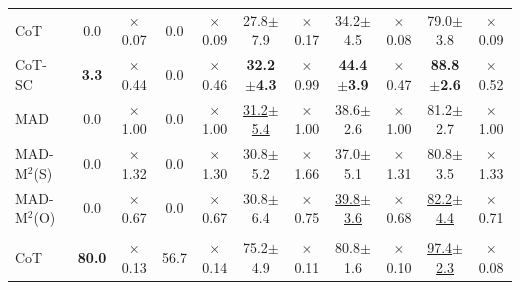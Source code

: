 \documentclass{article} %
\newcommand{\methodname}{MAD-M$^2$}
\theoremstyle{plain}
\begin{document}
\begin{table}[t]
\begin{center}
\begin{small}
\begin{threeparttable}
\begin{tabular}{lcccccccccc}
                    \midrule
                    \rowcolor{Gray}
                    \multicolumn{11}{c}{\texttt{DeepSeek-Math-7B-Instruct}} \\
                    \midrule
                    CoT & 0.0 & $\times$0.07 & 0.0 & $\times$0.09 & 27.8$\pm$7.9 & $\times$0.17 & 34.2$\pm$4.5 & $\times$0.08 & 79.0$\pm$3.8 & $\times$0.09\\
                    CoT-SC & \textbf{3.3} & $\times$0.44 & 0.0 & $\times$0.46 & \textbf{32.2$\pm$4.3} & $\times$0.99 & \textbf{44.4$\pm$3.9} & $\times$0.47 & \textbf{88.8$\pm$2.6} & $\times$0.52\\
                    MAD & 0.0  &$\times$1.00 & 0.0 &$\times$1.00 & \uline{31.2$\pm$5.4} &$\times$1.00 & 38.6$\pm$2.6 & $\times$1.00 & 81.2$\pm$2.7 & $\times$1.00\\
                    \rowcolor{gray!15}\methodname (S) & 0.0  &$\times$1.32 & 0.0 &$\times$1.30 & 30.8$\pm$5.2 &$\times$1.66 & 37.0$\pm$5.1 &$\times$1.31 & 80.8$\pm$3.5 & $\times$1.33\\
                    \rowcolor{gray!15}\methodname (O) & 0.0  & $\times$0.67 & 0.0 &$\times$0.67 & 30.8$\pm$6.4 &$\times$0.75 & \uline{39.8$\pm$3.6} &$\times$0.68 & \uline{82.2$\pm$4.4} & $\times$0.71\\
                    \midrule
                    \rowcolor{Gray}
                    \multicolumn{11}{c}{\texttt{QwQ-32B}} \\
                    \midrule
                    CoT & \textbf{80.0} & $\times$0.13 & 56.7 & $\times$0.14 & 75.2$\pm$4.9 & $\times$0.11 & 80.8$\pm$1.6 & $\times$0.10 & \uline{97.4$\pm$2.3} &$\times$0.08\\

\end{tabular}
\end{threeparttable}
\end{small}
\end{center}
\end{table}
\end{document}
